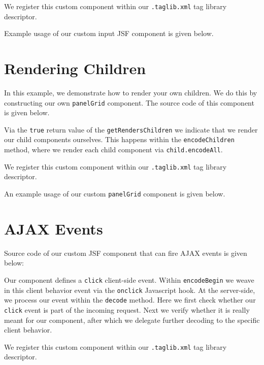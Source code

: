 We register this custom component within our \texttt{.taglib.xml} tag library descriptor.


Example usage of our custom input JSF component is given below.


\section{Rendering Children}
In this example, we demonstrate how to render your own children.
We do this by constructing our own \texttt{panelGrid} component.
The source code of this component is given below.

Via the \texttt{true} return value of the \texttt{getRendersChildren} we indicate that we render our child components ourselves.
This happens within the \texttt{encodeChildren} method, where we render each child component via \texttt{child.encodeAll}.

We register this custom component within our \texttt{.taglib.xml} tag library descriptor.


An example usage of our custom \texttt{panelGrid} component is given below.



\section{AJAX Events}

Source code of our custom JSF component that can fire AJAX events is given below:

Our component defines a \texttt{click} client-side event.
Within \texttt{encodeBegin} we weave in this client behavior event via the \texttt{onclick} Javascript hook.
At the server-side, we process our event within the \texttt{decode} method.
Here we first check whether our \texttt{click} event is part of the incoming request.
Next we verify whether it is really meant for our component, after which we delegate further decoding to the specific client behavior.

We register this custom component within our \texttt{.taglib.xml} tag library descriptor.



